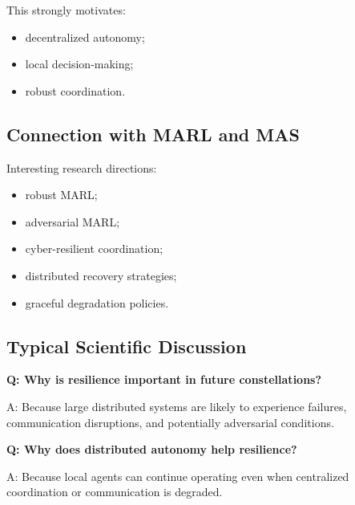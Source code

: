 \documentclass[10pt,a4paper,twocolumn]{article}
\begin{document}
This strongly motivates:
\begin{itemize}
    \item decentralized autonomy;
    \item local decision-making;
    \item robust coordination.
\end{itemize}


\subsection{Connection with MARL and MAS}

Interesting research directions:
\begin{itemize}
    \item robust MARL;
    \item adversarial MARL;
    \item cyber-resilient coordination;
    \item distributed recovery strategies;
    \item graceful degradation policies.
\end{itemize}


\subsection{Typical Scientific Discussion}

\begin{questionbox}
    \textbf{Q: Why is resilience important in future constellations?}

    A: Because large distributed systems are likely to experience failures, communication disruptions, and potentially adversarial conditions.
\end{questionbox}

\begin{questionbox}
    \textbf{Q: Why does distributed autonomy help resilience?}

    A: Because local agents can continue operating even when centralized coordination or communication is degraded.
\end{questionbox}
\end{document}
